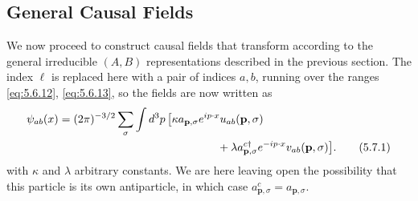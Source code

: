 
\subsection[General Causal Fields]{General Causal Fields\protect\footnotemark}

We now proceed to construct causal fields that transform according to the
general irreducible $(A,B)$ representations described in the previous section.
The index $\ell$ is replaced here with a pair of indices $a,b$, running over
the ranges \eqref{eq:5.6.12}, \eqref{eq:5.6.13}, so the fields are now written as
\begin{align}
\psi_{ab}(x)={}&(2\pi)^{-3/2}\sum_\sigma\int d^3p\,
\bigl[\kappa a_{\mathbf p,\sigma}e^{ip\cdot x}u_{ab}(\mathbf p,\sigma)
\notag\\
&\hspace{45mm}+\lambda a^{c\dagger}_{\mathbf p,\sigma}e^{-ip\cdot x}
v_{ab}(\mathbf p,\sigma)\bigr].
\tag{5.7.1}\label{eq:5.7.1}
\end{align}
with $\kappa$ and $\lambda$ arbitrary constants. We are here leaving open the
possibility that this particle is its own antiparticle, in which case
$a^c_{\mathbf p,\sigma}=a_{\mathbf p,\sigma}$.

